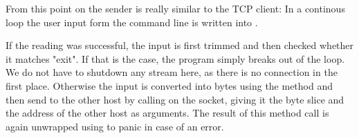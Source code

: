 From this point on the sender is really similar to the TCP client: In a continous loop the user input form the command
line is written into .

If the reading was successful, the input is first trimmed and then checked whether it
matches "exit". If that is the case, the program simply breaks out of the loop. We do not have to shutdown any stream
here, as there is no connection in the first place. Otherwise the input is converted into bytes using the method
 and then send to the other host by calling  on the socket, giving it the byte slice and
the address of the other host as arguments. The result of this method call is again unwrapped using  to
panic in case of an error.
